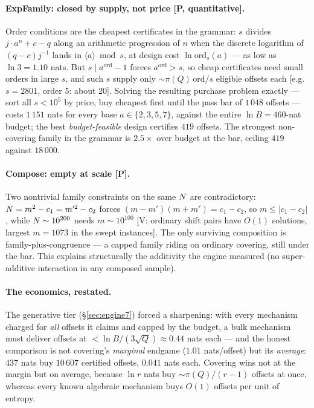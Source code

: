 \paragraph{ExpFamily: closed by supply, not price [P, quantitative].}
Order conditions are the cheapest certificates in the grammar: $s$
divides $j\cdot a^n+c-q$ along an arithmetic progression of $n$ when
the discrete logarithm of $(q-c)j^{-1}$ lands in
$\langle a\rangle\bmod s$, at design cost $\ln\mathrm{ord}_s(a)$ ---
as low as $\ln3=1.10$ nats. But $s\mid a^{\mathrm{ord}}-1$ forces
$a^{\mathrm{ord}}>s$, so cheap certificates need small orders in large
$s$, and such $s$ supply only $\sim\pi(Q)\,\mathrm{ord}/s$ eligible
offsets each [e.g.\ $s=2801$, order 5: about 20]. Solving the resulting
purchase problem exactly --- sort all $s<10^5$ by price, buy cheapest
first until the pass bar of $1\,048$ offsets --- costs $1\,151$ nats
for every base $a\in\{2,3,5,7\}$, against the entire
$\ln B=460$-nat budget; the best \emph{budget-feasible} design
certifies $419$ offsets. The strongest non-covering family in the
grammar is $2.5\times$ over budget at the bar, ceiling $419$ against
$18\,000$.

\paragraph{Compose: empty at scale [P].} Two nontrivial family
constraints on the same $N$ are contradictory: $N=m^2-c_1=m'^2-c_2$
forces $(m-m')(m+m')=c_1-c_2$, so $m\le|c_1-c_2|$, while
$N\sim10^{200}$ needs $m\sim10^{100}$ [V: ordinary shift pairs have
$O(1)$ solutions, largest $m=1073$ in the swept instances]. The only
surviving composition is family-plus-congruence --- a capped family
riding on ordinary covering, still under the bar. This explains
structurally the additivity the engine measured (no super-additive
interaction in any composed sample).

\paragraph{The economics, restated.} The generative tier
(\S\ref{sec:engine7}) forced a sharpening: with every mechanism charged
for \emph{all} offsets it claims and capped by the budget, a bulk
mechanism must deliver offsets at
$<\ln B/(3\sqrt Q)\approx0.44$ nats each --- and the honest comparison
is not covering's \emph{marginal} endgame ($1.01$ nats/offset) but its
\emph{average}: $437$ nats buy $10\,607$ certified offsets, $0.041$
nats each. Covering wins not at the margin but on average, because
$\ln r$ nats buy $\sim\pi(Q)/(r{-}1)$ offsets at once, whereas every
known algebraic mechanism buys $O(1)$ offsets per unit of entropy.

